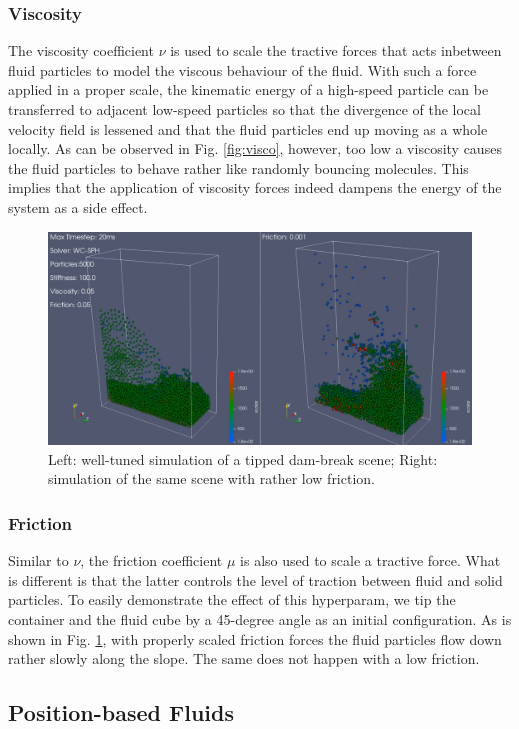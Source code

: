 \documentclass[
	11pt, 
	DIV10,
	ngerman,
	a4paper, 
	oneside, 
	headings=normal, 
	captions=tableheading,
	final, 
	numbers=noenddot
]{scrartcl}
\begin{document}
\subsubsection{Viscosity}

The viscosity coefficient $ \nu $ is used to scale the tractive forces that acts inbetween fluid particles to model the viscous behaviour of the fluid. With such a force applied in a proper scale, the kinematic energy of a high-speed particle can be transferred to adjacent low-speed particles so that the divergence of the local velocity field is lessened and that the fluid particles end up moving as a whole locally. As can be observed in Fig. \ref{fig:visco}, however, too low a viscosity causes the fluid particles to behave rather like randomly bouncing molecules. This implies that the application of viscosity forces indeed dampens the energy of the system as a side effect.

\begin{figure}[h]
    \centering
    \includegraphics[width=.6\textwidth]{pics/wcsph_friction.png}
    \caption{Left: well-tuned simulation of a tipped dam-break scene; Right: simulation of the same scene with rather low friction.}
    \label{fig:frict}
\end{figure}

\subsubsection{Friction}

Similar to $ \nu $, the friction coefficient $ \mu $ is also used to scale a tractive force. What is different is that the latter controls the level of traction between fluid and solid particles. To easily demonstrate the effect of this hyperparam, we tip the container and the fluid cube by a 45-degree angle as an initial configuration. As is shown in Fig. \ref{fig:frict}, with properly scaled friction forces the fluid particles flow down rather slowly along the slope. The same does not happen with a low friction.

\subsection{Position-based Fluids}
\end{document}
